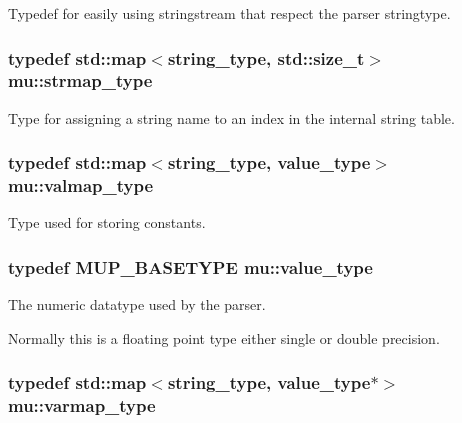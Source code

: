 Typedef for easily using stringstream that respect the parser stringtype. 

\subsubsection[{\texorpdfstring{strmap\+\_\+type}{strmap_type}}]{\setlength{\rightskip}{0pt plus 5cm}typedef std\+::map$<${\bf string\+\_\+type}, std\+::size\+\_\+t$>$ {\bf mu\+::strmap\+\_\+type}}\hypertarget{namespacemu_aea1c20093e51d3dc13de10f3c17ae5b1}{}\label{namespacemu_aea1c20093e51d3dc13de10f3c17ae5b1}


Type for assigning a string name to an index in the internal string table. 

\subsubsection[{\texorpdfstring{valmap\+\_\+type}{valmap_type}}]{\setlength{\rightskip}{0pt plus 5cm}typedef std\+::map$<${\bf string\+\_\+type}, {\bf value\+\_\+type}$>$ {\bf mu\+::valmap\+\_\+type}}\hypertarget{namespacemu_a5940d281286a01342cf773f74481843c}{}\label{namespacemu_a5940d281286a01342cf773f74481843c}


Type used for storing constants. 

\subsubsection[{\texorpdfstring{value\+\_\+type}{value_type}}]{\setlength{\rightskip}{0pt plus 5cm}typedef {\bf M\+U\+P\+\_\+\+B\+A\+S\+E\+T\+Y\+PE} {\bf mu\+::value\+\_\+type}}\hypertarget{namespacemu_a17d4f113a4b88b8d971cca8ddbbe8a47}{}\label{namespacemu_a17d4f113a4b88b8d971cca8ddbbe8a47}


The numeric datatype used by the parser. 

Normally this is a floating point type either single or double precision. 
\subsubsection[{\texorpdfstring{varmap\+\_\+type}{varmap_type}}]{\setlength{\rightskip}{0pt plus 5cm}typedef std\+::map$<${\bf string\+\_\+type}, {\bf value\+\_\+type}$\ast$$>$ {\bf mu\+::varmap\+\_\+type}}\hypertarget{namespacemu_ab57755354e948a664ad94d38546dbb10}{}\label{namespacemu_ab57755354e948a664ad94d38546dbb10}


